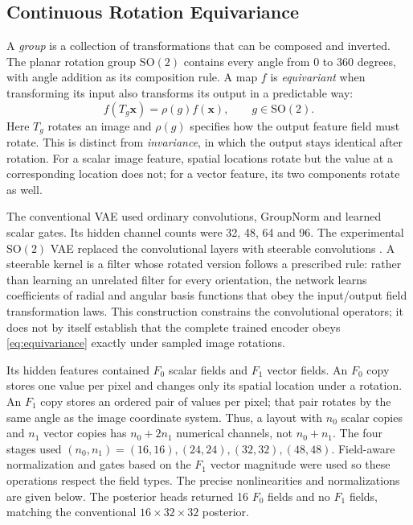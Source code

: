 \documentclass{midl}
\newcommand{\SOtwo}{\mathrm{SO}(2)}
\begin{document}
\subsection{Continuous Rotation Equivariance}

A \emph{group} is a collection of transformations that can be composed and inverted. The planar rotation group $\SOtwo$ contains every angle from $0$ to $360$ degrees, with angle addition as its composition rule. A map $f$ is \emph{equivariant} when transforming its input also transforms its output in a predictable way:
\begin{equation}
f(T_g\mathbf{x})=\rho(g)f(\mathbf{x}),\qquad g\in\SOtwo.
\label{eq:equivariance}
\end{equation}
Here $T_g$ rotates an image and $\rho(g)$ specifies how the output feature field must rotate. This is distinct from \emph{invariance}, in which the output stays identical after rotation. For a scalar image feature, spatial locations rotate but the value at a corresponding location does not; for a vector feature, its two components rotate as well.

The conventional VAE used ordinary convolutions, GroupNorm and learned scalar gates. Its hidden channel counts were 32, 48, 64 and 96. The experimental $\SOtwo$ VAE replaced the convolutional layers with steerable convolutions \cite{cohen_steerable_2017,weiler_general_2019}. A steerable kernel is a filter whose rotated version follows a prescribed rule: rather than learning an unrelated filter for every orientation, the network learns coefficients of radial and angular basis functions that obey the input/output field transformation laws. This construction constrains the convolutional operators; it does not by itself establish that the complete trained encoder obeys \autoref{eq:equivariance} exactly under sampled image rotations.

Its hidden features contained $F_0$ scalar fields and $F_1$ vector fields. An $F_0$ copy stores one value per pixel and changes only its spatial location under a rotation. An $F_1$ copy stores an ordered pair of values per pixel; that pair rotates by the same angle as the image coordinate system. Thus, a layout with $n_0$ scalar copies and $n_1$ vector copies has $n_0+2n_1$ numerical channels, not $n_0+n_1$. The four stages used $(n_0,n_1)=(16,16),(24,24),(32,32),(48,48)$. Field-aware normalization and gates based on the $F_1$ vector magnitude were used so these operations respect the field types. The precise nonlinearities and normalizations are given below. The posterior heads returned 16 $F_0$ fields and no $F_1$ fields, matching the conventional $16\times32\times32$ posterior.
\end{document}
